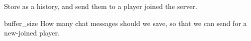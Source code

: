 Store  as a history, and send them to a player joined the server.

\begin{Configuration}
    \item[buffer\_size]{
        How many chat messages should we save, so that we can send for a new-joined player.
    }
\end{Configuration}




